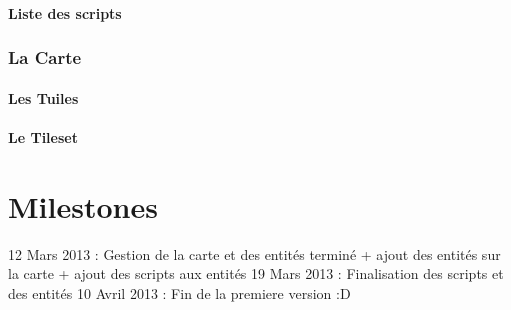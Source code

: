 \documentclass[a4paper]{article}
\begin{document}
		\subsection{Liste des scripts}
			
    \section{La Carte}
		\subsection{Les Tuiles}
		\subsection{Le Tileset}
			
\newpage
  \part{Milestones}
	12 Mars 2013 : Gestion de la carte et des entités terminé + ajout des entités sur la carte + ajout des scripts aux entités
	19 Mars 2013 : Finalisation des scripts et des entités
	10 Avril 2013 : Fin de la premiere version :D
\end{document}

